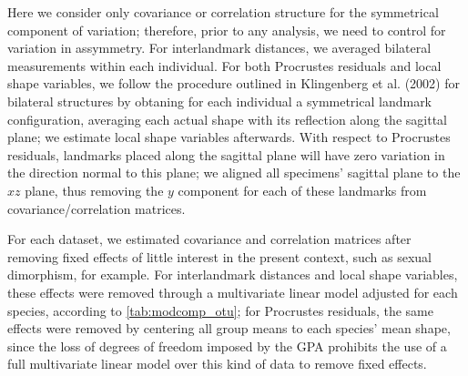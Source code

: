 \documentclass[12pt,]{article}
\begin{document}
Here we consider only covariance or correlation structure for the
symmetrical component of variation; therefore, prior to any analysis, we
need to control for variation in assymmetry. For interlandmark
distances, we averaged bilateral measurements within each individual.
For both Procrustes residuals and local shape variables, we follow the
procedure outlined in Klingenberg et al. (2002) for bilateral structures
by obtaning for each individual a symmetrical landmark configuration,
averaging each actual shape with its reflection along the sagittal
plane; we estimate local shape variables afterwards. With respect to
Procrustes residuals, landmarks placed along the sagittal plane will
have zero variation in the direction normal to this plane; we aligned
all specimens' sagittal plane to the $xz$ plane, thus removing the $y$
component for each of these landmarks from covariance/correlation
matrices.

For each dataset, we estimated covariance and correlation matrices after
removing fixed effects of little interest in the present context, such
as sexual dimorphism, for example. For interlandmark distances and local
shape variables, these effects were removed through a multivariate
linear model adjusted for each species, according to
\autoref{tab:modcomp_otu}; for Procrustes residuals, the same effects
were removed by centering all group means to each species' mean shape,
since the loss of degrees of freedom imposed by the GPA prohibits the
use of a full multivariate linear model over this kind of data to remove
fixed effects.
\end{document}
